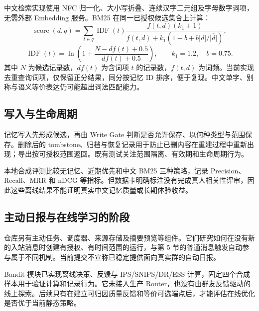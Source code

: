 中文检索实现使用 NFC 归一化、大小写折叠、连续汉字二元组及字母数字词项，无需外部 Embedding 服务。BM25 在同一已授权候选集合上计算：
\[
\operatorname{score}(d,q)=\sum_{t\in q}\operatorname{IDF}(t)
\frac{f(t,d)(k_1+1)}{f(t,d)+k_1(1-b+b|d|/\overline{|d|})},
\]
\[
\operatorname{IDF}(t)=\ln\!\left(1+\frac{N-df(t)+0.5}{df(t)+0.5}\right),
\qquad k_1=1.2,\quad b=0.75.
\]
其中 $N$ 为候选记录数，$df(t)$ 为含词项 $t$ 的记录数，$f(t,d)$ 为词频。当前实现去重查询词项，仅保留正分结果，同分按记忆 ID 排序，便于复现。中文单字、别称与语义等价表达仍可能超出词法匹配能力。

\subsection{写入与生命周期}
记忆写入先形成候选，再由 Write Gate 判断是否允许保存、以何种类型与范围保存。删除后的 tombstone、归档与恢复记录用于防止已删内容在重建过程中重新出现；导出按可授权范围返回。既有测试关注范围隔离、有效期和生命周期行为。

本地合成评测比较无记忆、近期优先和中文 BM25 三种策略，记录 Precision、Recall、MRR 和 nDCG 等指标。但数据卡明确标注没有完成真人相关性评审，因此这些离线结果不能证明真实中文记忆质量或长期体验收益。

\subsection{主动日报与在线学习的阶段}
仓库另有主动任务、调度器、来源存储及摘要预览等组件。它们研究如何在没有新的入站消息时创建有授权、有时间范围的运行，与第 5 节的普通消息触发自动参与属于不同机制。当前提交不宣称已稳定提供面向真实群的自动日报。

Bandit 模块已实现离线决策、反馈与 IPS/SNIPS/DR/ESS 计算，固定四个合成样本用于验证计算和记录行为。它未接入生产 Router，也没有由群友反馈驱动的线上探索。后续只有在建立可归因质量反馈和等价可选端点后，才能评估在线优化是否优于当前静态策略。
